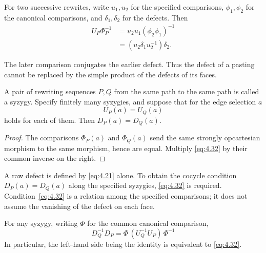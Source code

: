 For two successive rewrites, write $u_1,u_2$ for the specified comparisons,
$\phi_1,\phi_2$ for the canonical comparisons, and $\delta_1,\delta_2$ for the defects.
Then
\begin{equation*}
\begin{aligned}
U_P\Phi_P^{-1}
 &=u_2u_1(\phi_2\phi_1)^{-1}\\
 &=(u_2\delta_1u_2^{-1})\delta_2.
\end{aligned}
\tag{4.31}\label{eq:4.31}
\end{equation*}

The later comparison conjugates the earlier defect.
Thus the defect of a pasting cannot be replaced by the simple product of the defects
of its faces.

\begin{proposition}\label{prop:4.26}

A pair of rewriting sequences $P,Q$ from the same path to the same path is called a
syzygy.
Specify finitely many syzygies, and suppose that for the edge selection $a$
\begin{equation*}
U_P(a)=U_Q(a)
\tag{4.32}\label{eq:4.32}
\end{equation*}
holds for each of them. Then
$D_P(a)=D_Q(a)$.

\end{proposition}

\begin{proof}

The comparisons $\Phi_P(a)$ and $\Phi_Q(a)$ send the same strongly opcartesian morphism
to the same morphism, hence are equal. Multiply \eqref{eq:4.32} by their common inverse
on the right.

\end{proof}

A raw defect is defined by \eqref{eq:4.21} alone.
To obtain the cocycle condition $D_P(a)=D_Q(a)$ along the specified syzygies,
\eqref{eq:4.32} is required.
Condition~\eqref{eq:4.32} is a relation among the specified comparisons; it does not
assume the vanishing of the defect on each face.

\begin{proposition}\label{prop:4.27}

For any syzygy, writing $\Phi$ for the common canonical comparison,
\begin{equation*}
D_Q^{-1}D_P
=\Phi\,(U_Q^{-1}U_P)\,\Phi^{-1}
\tag{4.33}\label{eq:4.33}
\end{equation*}
In particular, the left-hand side being the identity is equivalent to \eqref{eq:4.32}.

\end{proposition}

